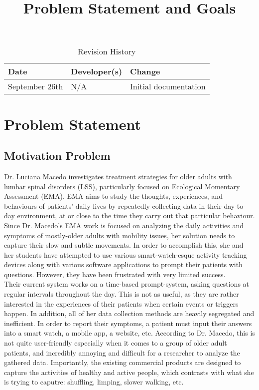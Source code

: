 \documentclass[12pt]{article}
\title{Problem Statement and Goals\\\progname}
\author{\authname}
\date{}
\begin{document}
\maketitle

\begin{table}[hp]
    \caption{Revision History} \label{TblRevisionHistory}
    \begin{tabularx}{\textwidth}{llX}
        \toprule
        \textbf{Date}  & \textbf{Developer(s)} & \textbf{Change}       \\
        \midrule
        September 26th &    N/A   & Initial documentation \\
        \bottomrule
    \end{tabularx}
\end{table}

\newpage

\section{Problem Statement}

\subsection{Motivation Problem}

Dr. Luciana Macedo investigates treatment strategies for older adults with  lumbar spinal disorders (LSS), particularly focused on Ecological Momentary Assessment (EMA). EMA aims to study the thoughts, experiences, and behaviours of patients' daily lives by repeatedly collecting data in their day-to-day environment, at or close to the time they carry out that particular behaviour.\\

Since Dr. Macedo's EMA work is focused on analyzing the daily activities and symptoms of mostly-older adults with mobility issues, her solution needs to capture their slow and subtle movements. In order to accomplish this, she and her students have attempted to use various smart-watch-esque activity tracking devices along with various software applications to prompt their patients with questions. However, they have been frustrated with very limited success.\\

Their current system works on a time-based prompt-system, asking questions at regular intervals throughout the day. This is not as useful, as they are rather interested in the experiences of their patients when certain events or triggers happen. In addition, all of her data collection methods are heavily segregated and inefficient. In order to report their symptoms, a patient must input their answers into a smart watch, a mobile app, a website, etc. According to Dr. Macedo, this is not quite user-friendly especially when it comes to a group of older adult patients, and incredibly annoying and difficult for a researcher to analyze the gathered data. Importantly, the existing commercial products are designed to capture the activities of healthy and active people, which contrasts with what she is trying to caputre: shuffling, limping, slower walking, etc.\\
\end{document}
